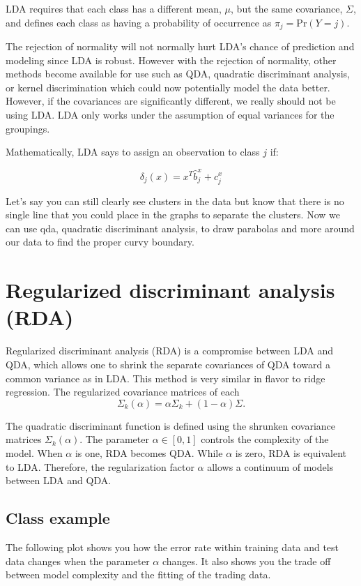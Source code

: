 \documentclass[a4paper]{article}
\begin{document}
LDA requires that each class has a different mean, $\mu$, but the same covariance, $\Sigma$, and defines each class as having a probability of occurrence as $\pi_{j}=\text{Pr}(Y=j)$.

The rejection of normality will not normally hurt LDA's chance of prediction and modeling since LDA is robust. However with the rejection of normality, other methods become available for use such as QDA, quadratic discriminant analysis, or kernel discrimination which could now potentially model the data better. However, if the covariances are significantly different, we really should not be using LDA. LDA only works under the assumption of equal variances for the groupings.


Mathematically, LDA says to assign an observation to class $j$ if:

$$\delta_{j}(x)=x^{T}\hat{b}^{x}_{j}+c^{x}_{j}$$

Let's say you can still clearly see clusters in the data but know that there is no single line that you could place in the graphs to separate the clusters. Now we can use qda, quadratic discriminant analysis, to draw parabolas and more around our data to find the proper curvy boundary. 

\section{Regularized discriminant analysis (RDA)}
Regularized discriminant analysis (RDA) is a compromise between LDA and QDA, which allows one to shrink the separate covariances of QDA toward a common variance as in LDA. This method is very similar in flavor to ridge regression. The regularized covariance matrices of each \begin{equation}
\Sigma_k(\alpha)=\alpha\Sigma_k+(1-\alpha)\Sigma. 
\end{equation}

The quadratic discriminant function is defined using the shrunken covariance matrices $\Sigma_k(\alpha)$. The parameter $\alpha \in [0, 1]$ controls the complexity of the model. When $\alpha$ is one, RDA becomes QDA. While $\alpha$ is zero, RDA is equivalent to LDA. Therefore, the regularization factor $\alpha$ allows a continuum of models between LDA and QDA.

\subsection{Class example}
The following plot shows you how the error rate within training data and test data changes when the parameter $\alpha$ changes. It also shows you the trade off between model complexity and the fitting of the trading data.
\end{document}

